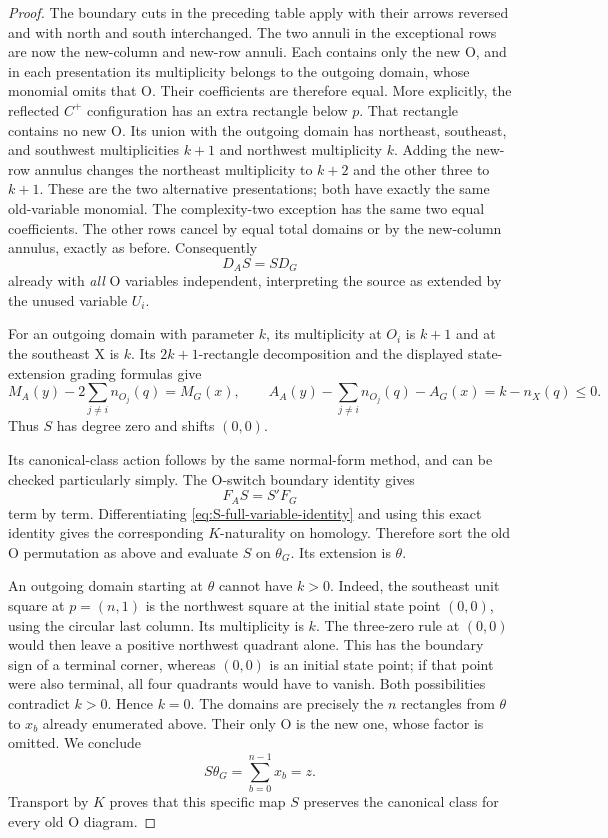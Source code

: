 \documentclass[11pt,a4paper]{article}
\theoremstyle{remark}
\begin{document}
\begin{proof}
The boundary cuts in the preceding table apply with their arrows
reversed and with north and south interchanged.  The two annuli in
the exceptional rows are now the new-column and new-row annuli.
Each contains only the new O, and in each presentation its
multiplicity belongs to the outgoing domain, whose monomial omits
that O.  Their coefficients are therefore equal.  More explicitly,
the reflected $C^+$ configuration has an extra rectangle below $p$.
That rectangle contains no new O.  Its union with the outgoing
domain has northeast, southeast, and southwest multiplicities
$k+1$ and northwest multiplicity $k$.  Adding the new-row annulus
changes the northeast multiplicity to $k+2$ and the other three to
$k+1$.  These are the two alternative presentations; both have
exactly the same old-variable monomial.  The complexity-two
exception has the same two equal coefficients.  The other rows
cancel by equal total domains or by the new-column annulus, exactly
as before.  Consequently
\begin{equation}\label{eq:S-full-variable-identity}
 D_A S=S D_G
\end{equation}
already with \emph{all} O variables independent, interpreting the
source as extended by the unused variable $U_i$.

For an outgoing domain with parameter $k$, its multiplicity at
$O_i$ is $k+1$ and at the southeast X is $k$.  Its $2k+1$-rectangle
decomposition and the displayed state-extension grading formulas give
\[
 M_A(y)-2\sum_{j\ne i}n_{O_j}(q)=M_G(x),
\qquad
 A_A(y)-\sum_{j\ne i}n_{O_j}(q)-A_G(x)
       =k-n_X(q)\le0.
\]
Thus $S$ has degree zero and shifts $(0,0)$.

Its canonical-class action follows by the same normal-form method,
and can be checked particularly simply.  The O-switch boundary
identity gives
\[
 F_A S=S'F_G
\]
term by term.  Differentiating \eqref{eq:S-full-variable-identity}
and using this exact identity gives the corresponding $K$-naturality
on homology.  Therefore sort the old O permutation as above and
evaluate $S$ on $\theta_G$.  Its extension is $\theta$.

An outgoing domain starting at $\theta$ cannot have $k>0$.
Indeed, the southeast unit square at $p=(n,1)$ is the northwest
square at the initial state point $(0,0)$, using the circular last
column.  Its multiplicity is $k$.  The three-zero rule at $(0,0)$
would then leave a positive northwest quadrant alone.  This has
the boundary sign of a terminal corner, whereas $(0,0)$ is an
initial state point; if that point were also terminal, all four
quadrants would have to vanish.  Both possibilities contradict
$k>0$.  Hence $k=0$.  The domains are precisely the $n$ rectangles
from $\theta$ to $x_b$ already enumerated above.  Their only O is
the new one, whose factor is omitted.  We conclude
\[
 S\theta_G=\sum_{b=0}^{n-1}x_b=z.
\]
Transport by $K$ proves that this specific map $S$ preserves the
canonical class for every old O diagram.


\end{proof}
\end{document}

